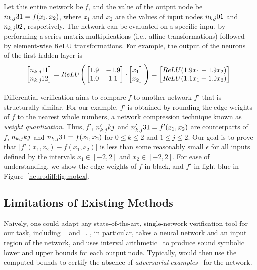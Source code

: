 Let this entire network be $ f $, and the value of the output node be
$ n_{k,j}{3}{1} = f(x_1, x_2) $, where $ x_1$ and $x_2 $ are the values of
input nodes $ n_{k,j}{0}{1}$ and $n_{k,j}{0}{2} $, respectively.
%
The network can be evaluated on a specific input by performing a
series matrix multiplications (i.e., affine transformations) followed
by element-wise ReLU transformations. For example, the output of
the neurons of the first hidden layer is
\[
\begin{bmatrix}
n_{k,j}{1}{1} \\
n_{k,j}{1}{2}
\end{bmatrix}
=
ReLU\Bigg(
\begin{bmatrix}
1.9 & -1.9 \\
1.0 & 1.1
\end{bmatrix}
\cdot
\begin{bmatrix}
x_1 \\
x_2
\end{bmatrix}
\Bigg)
=
\begin{bmatrix}
ReLU(1.9x_1 - 1.9x_2) \\
ReLU(1.1x_1 + 1.0x_2)
\end{bmatrix}
\]

Differential verification aims to compare $ f $ to another network $
f' $ that is structurally similar. For our example, $f'$ is
obtained by rounding the edge weights of $ f $ to the nearest whole
numbers, a network compression technique known as \textit{weight
quantization}.
%
Thus, $ f' $, $ n'_{k,j}{k}{j} $ and $ n'_{k,j}{3}{1} = f'(x_1, x_2) $ are
counterparts of $ f $, $ n_{k,j}{k}{j} $ and $ n_{k,j}{3}{1} = f(x_1, x_2) $ for
$0\leq k\leq 2$ and $1\leq j\leq 2$.
%
Our goal is to prove that $ |f'(x_1, x_2) - f(x_1, x_2)| $ is less
than some reasonably small $ \epsilon $ for all inputs defined by the
intervals $ x_1 \in [-2,2]$ and $x_2 \in [-2,2] $.
%
For ease of understanding, we show the edge weights of $ f $ in black, and
$ f' $ in light blue in Figure~\ref{neurodiff:fig:motex}.


\subsection{Limitations of Existing Methods}

Naively, one could adapt any state-of-the-art, single-network
verification tool for our task,
including \DeepPoly{}~\cite{SinghGPV19}
and \Neurify{}~\cite{WangPWYJ18nips}.
%
\Neurify{}, in particular, takes a neural network and
an input region of the network, and uses interval
arithmetic~\cite{moore2009introduction, WangPWYJ18} to produce sound
symbolic lower and upper bounds for each output node.
Typically, \Neurify{} would then use the computed bounds to certify
the absence of \textit{adversarial
examples}~\cite{szegedy2013intriguing} for the network.

